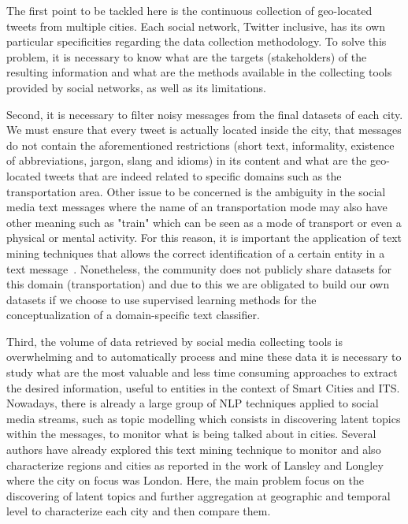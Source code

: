 The first point to be tackled here is the continuous collection of geo-located tweets from multiple cities. Each social network, Twitter inclusive, has its own particular specificities regarding the data collection methodology. To solve this problem, it is necessary to know what are the targets (stakeholders) of the resulting information and what are the methods available in the collecting tools provided by social networks, as well as its limitations.

Second, it is necessary to filter noisy messages from the final datasets of each city. We must ensure that every tweet is actually located inside the city, that messages do not contain the aforementioned restrictions (short text, informality, existence of abbreviations, jargon, slang and idioms) in its content and what are the geo-located tweets that are indeed related to specific domains such as the transportation area. Other issue to be concerned is the ambiguity in the social media text messages where the name of an transportation mode may also have other meaning such as "train" which can be seen as a mode of transport or even a physical or mental activity. For this reason, it is important the application of text mining techniques that allows the correct identification of a certain entity in a text message~\cite{saleiro2013popstar}. Nonetheless, the community does not publicly share datasets for this domain (transportation) and due to this we are obligated to build our own datasets if we choose to use supervised learning methods for the conceptualization of a domain-specific text classifier.

Third, the volume of data retrieved by social media collecting tools is overwhelming and to automatically process and mine these data it is necessary to study what are the most valuable and less time consuming approaches to extract the desired information, useful to entities in the context of Smart Cities and \gls{ITS}. Nowadays, there is already a large group of \gls{NLP} techniques applied to social media streams, such as topic modelling which consists in discovering latent topics within the messages, to monitor what is being talked about in cities. Several authors have already explored this text mining technique to monitor and also characterize regions and cities as reported in the work of Lansley and Longley~\cite{lansley2016geography} where the city on focus was London. Here, the main problem focus on the discovering of latent topics and further aggregation at geographic and temporal level to characterize each city and then compare them. 

